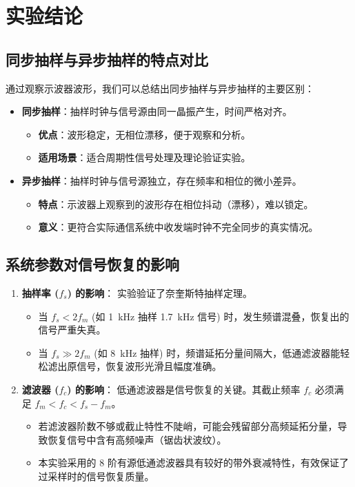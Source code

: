 \documentclass[12pt]{ctexart}
\begin{document}
\section{实验结论}
\subsection{同步抽样与异步抽样的特点对比}
通过观察示波器波形，我们可以总结出同步抽样与异步抽样的主要区别：
\begin{itemize}
    \item \textbf{同步抽样}：抽样时钟与信号源由同一晶振产生，时间严格对齐。
    \begin{itemize}
        \item \textbf{优点}：波形稳定，无相位漂移，便于观察和分析。
        \item \textbf{适用场景}：适合周期性信号处理及理论验证实验。
    \end{itemize}
    \item \textbf{异步抽样}：抽样时钟与信号源独立，存在频率和相位的微小差异。
    \begin{itemize}
        \item \textbf{特点}：示波器上观察到的波形存在相位抖动（漂移），难以锁定。
        \item \textbf{意义}：更符合实际通信系统中收发端时钟不完全同步的真实情况。
    \end{itemize}
\end{itemize}
\subsection{系统参数对信号恢复的影响}
\begin{enumerate}
    \item \textbf{抽样率 ($f_s$) 的影响}：
    实验验证了奈奎斯特抽样定理。
    \begin{itemize}
        \item 当 $f_s < 2f_m$ (如 \SI{1}{kHz} 抽样 \SI{1.7}{kHz} 信号) 时，发生频谱混叠，恢复出的信号严重失真。
        \item 当 $f_s \gg 2f_m$ (如 \SI{8}{kHz} 抽样) 时，频谱延拓分量间隔大，低通滤波器能轻松滤出原信号，恢复波形光滑且幅度准确。
    \end{itemize}
    
    \item \textbf{滤波器 ($f_c$) 的影响}：
    低通滤波器是信号恢复的关键。其截止频率 $f_c$ 必须满足 $f_m < f_c < f_s - f_m$。
    \begin{itemize}
        \item 若滤波器阶数不够或截止特性不陡峭，可能会残留部分高频延拓分量，导致恢复信号中含有高频噪声（锯齿状波纹）。
        \item 本实验采用的 8 阶有源低通滤波器具有较好的带外衰减特性，有效保证了过采样时的信号恢复质量。
    \end{itemize}
\end{enumerate}
\end{document}
